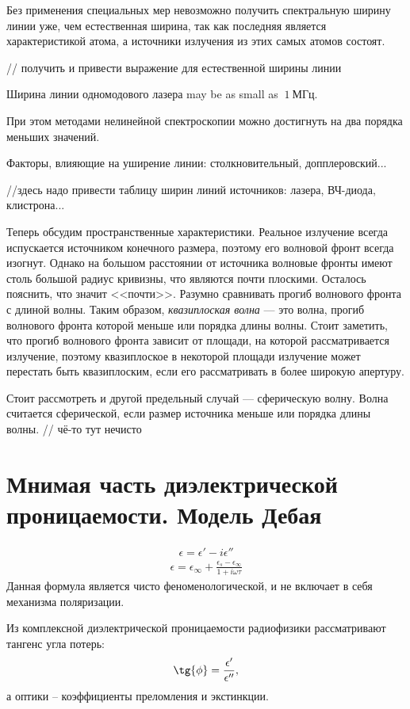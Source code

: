 Без применения специальных мер невозможно получить спектральную ширину линии
уже, чем естественная ширина, так как последняя является характеристикой атома,
а источники излучения из этих самых атомов состоят.

// получить и привести выражение для естественной ширины линии

Ширина линии одномодового лазера may be as small as \(~1~\text{МГц}\).
\begin{remark}
При этом методами нелинейной спектроскопии можно достигнуть на два порядка
меньших значений.
\end{remark}
Факторы, влияющие на уширение линии: столкновительный, допплеровский...

//здесь надо привести таблицу ширин линий источников: лазера, ВЧ-диода,
клистрона...

Теперь обсудим пространственные характеристики. Реальное излучение всегда
испускается источником конечного размера, поэтому его волновой фронт всегда
изогнут. Однако на большом расстоянии от источника волновые фронты имеют столь
большой радиус кривизны, что являются почти плоскими. Осталось пояснить, что
значит <<почти>>. Разумно сравнивать прогиб волнового фронта с длиной волны.
Таким образом, \emph{квазиплоская волна} --- это волна, прогиб волнового фронта
которой меньше или порядка длины волны. Стоит заметить, что прогиб волнового
фронта зависит от площади, на которой рассматривается излучение, поэтому 
квазиплоское в некоторой площади излучение может перестать быть квазиплоским,
если его рассматривать в более широкую апертуру.

Стоит рассмотреть и другой предельный случай --- сферическую волну. Волна
считается сферической, если размер источника меньше или порядка длины волны.
// чё-то тут нечисто

\section{Мнимая часть диэлектрической проницаемости. Модель Дебая}
\begin{align*}
  \epsilon = \epsilon' - i\epsilon''
\end{align*}
\begin{align*}
  \epsilon = \epsilon_{\infty} + \frac{\epsilon_{s}
  - \epsilon_{\infty}}{1 + i\omega\tau}
\end{align*}
Данная формула является чисто феноменологической, и не включает в себя механизма
поляризации.

Из комплексной диэлектрической проницаемости радиофизики рассматривают тангенс
угла потерь:
\begin{align*}
  \tg{\phi} = \frac{\epsilon'}{\epsilon''},
\end{align*}
а оптики -- коэффициенты преломления и экстинкции.

